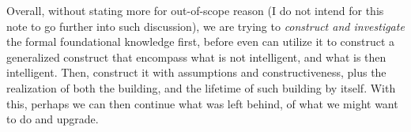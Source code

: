 Overall, without stating more for out-of-scope reason (I do not intend for this note to go further into such discussion), we are trying to \textit{construct and investigate} the formal foundational knowledge first, before even can utilize it to construct a generalized construct that encompass what is not intelligent, and what is then intelligent. Then, construct it with assumptions and constructiveness, plus the realization of both the building, and the lifetime of such building by itself. With this, perhaps we can then continue what was left behind, of what we might want to do and upgrade. 